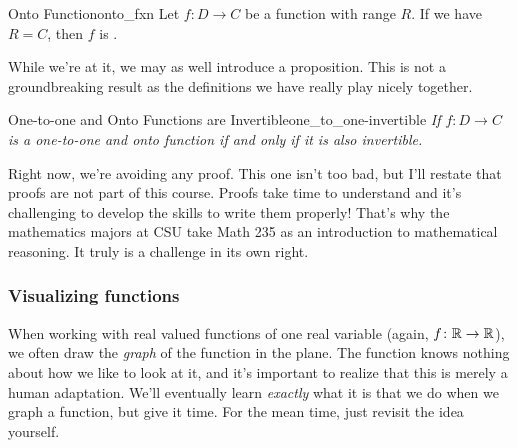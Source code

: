     \begin{df}{Onto Function}{onto_fxn}
    Let $f\colon D \to C$ be a function with range $R$. If we have $R=C$, then $f$ is .
    \end{df}

    While we're at it, we may as well introduce a proposition. This is not a groundbreaking result as the definitions we have really play nicely together.

    \begin{prop}{One-to-one and Onto Functions are Invertible}{one_to_one-invertible}
    \textit{If $f\colon D \to C$ is a one-to-one and onto function if and only if it is also invertible.}

    \end{prop}
    Right now, we're avoiding any proof.  This one isn't too bad, but I'll restate that proofs are not part of this course. Proofs take time to understand and it's challenging to develop the skills to write them properly!  That's why the mathematics majors at CSU take Math 235 as an introduction to mathematical reasoning.  It truly is a challenge in its own right.


    \subsubsection{Visualizing functions}
    When working with real valued functions of one real variable (again, $f\colon \mathbb{R} \to \mathbb{R}$), we often draw the \emph{graph} of the function in the plane.  The function knows nothing about how we like to look at it, and it's important to realize that this is merely a human adaptation.  We'll eventually learn \emph{exactly} what it is that we do when we graph a function, but give it time.  For the mean time, just revisit the idea yourself.

